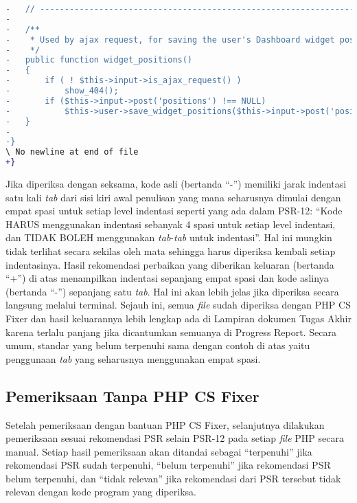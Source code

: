 \begin{lstlisting}[language=diff, basicstyle=\ttfamily, frame=single,
	columns=fullflexible, keepspaces=true, breaklines=true, label=ck:31, caption=Contoh penggunaan PHP CS Fixer pada \textit{Dashboard.php}]
-	// ------------------------------------------------------------------------
-
-	/**
-	 * Used by ajax request, for saving the user's Dashboard widget positions
-	 */
-	public function widget_positions()
-	{
-		if ( ! $this->input->is_ajax_request() )
-			show_404();
-		if ($this->input->post('positions') !== NULL)
-			$this->user->save_widget_positions($this->input->post('positions'));
-	}
-
-}
\ No newline at end of file
+}

\end{lstlisting}

Jika diperiksa dengan seksama, kode asli (bertanda ``-'') memiliki jarak indentasi satu kali \textit{tab} dari sisi kiri awal penulisan yang mana seharusnya dimulai dengan empat spasi untuk setiap level indentasi seperti yang ada dalam PSR-12: ``Kode HARUS menggunakan indentasi sebanyak 4 spasi untuk setiap level indentasi, dan TIDAK BOLEH menggunakan \textit{tab}-\textit{tab} untuk indentasi''. Hal ini mungkin tidak terlihat secara sekilas oleh mata sehingga harus diperiksa kembali setiap indentasinya. Hasil rekomendasi perbaikan yang diberikan keluaran (bertanda ``+'') di atas menampilkan indentasi sepanjang empat spasi dan kode aslinya (bertanda ``-'') sepanjang satu \textit{tab}. Hal ini akan lebih jelas jika diperiksa secara langsung melalui terminal. 
Sejauh ini, semua \textit{file} sudah diperiksa dengan PHP CS Fixer dan hasil keluarannya lebih lengkap ada di Lampiran dokumen Tugas Akhir karena terlalu panjang jika dicantumkan semuanya di Progress Report. Secara umum, standar yang belum terpenuhi sama dengan contoh di atas yaitu penggunaan \textit{tab} yang seharusnya menggunakan empat spasi. 			


\subsection{Pemeriksaan Tanpa PHP CS Fixer}
\label{periksa_manual}
Setelah pemeriksaan dengan bantuan PHP CS Fixer, selanjutnya dilakukan pemeriksaan sesuai rekomendasi PSR selain PSR-12 pada setiap \textit{file} PHP secara manual. Setiap hasil pemeriksaan akan ditandai sebagai ``terpenuhi'' jika rekomendasi PSR sudah terpenuhi, ``belum terpenuhi'' jika rekomendasi PSR belum terpenuhi, dan ``tidak relevan'' jika rekomendasi dari PSR tersebut tidak relevan dengan kode program yang diperiksa.

